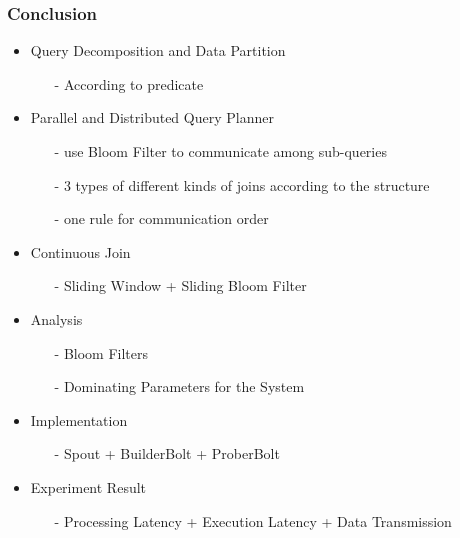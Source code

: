\begin{frame}
\frametitle{Conclusion}
\vspace{-0.1in}
	\begin{itemize}
		\item Query Decomposition and Data Partition
		\begin{itemize}
		\item[-] According to predicate
		\end{itemize}
		\item Parallel and Distributed Query Planner
		\begin{itemize}
		\item[-] use Bloom Filter to communicate among sub-queries
		\item[-] 3 types of different kinds of joins according to the structure
		\item[-] one rule for communication order
		\end{itemize}
		\item Continuous Join
		\begin{itemize}
		\item[-] Sliding Window + Sliding Bloom Filter
		\end{itemize}
		\item Analysis
		\begin{itemize}
		\item[-] Bloom Filters
		\item[-] Dominating Parameters for the System
		\end{itemize}
		\item Implementation
		\begin{itemize}
		\item[-] Spout + BuilderBolt + ProberBolt
		\end{itemize}
		\item Experiment Result
		\begin{itemize}
		\item[-] Processing Latency + Execution Latency + Data Transmission
		\end{itemize}
	\end{itemize}
\end{frame}
